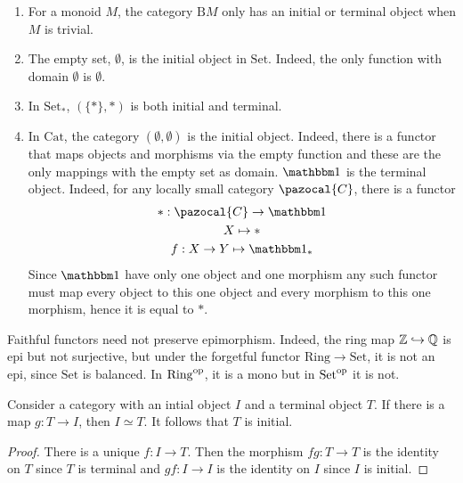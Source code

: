 \begin{example}
\begin{enumerate}
            \item For a monoid $M$, the category $\mathrm{B}M$ only has an initial or terminal object when $M$ is trivial. 
            \item The empty set, $\emptyset$, is the initial object in $\mathrm{Set}$. Indeed, the only function with domain $\emptyset$ is $\emptyset$.
            \item In $\mathrm{Set}_\ast$, $(\{\ast\},\ast)$ is both initial and terminal.
            \item In $\mathrm{Cat}$, the category $(\emptyset,\emptyset)$ is the initial object. Indeed, there is a functor that maps objects and morphisms via the empty function and these are the only mappings with the empty set as domain. $\fone$ is the terminal object. Indeed, for any locally small category $\pazocal{C}$, there is a functor 
            \begin{gather*}
                \ast : \pazocal{C}\rightarrow\fone\\
                X\mapsto \ast\\
                f: X\rightarrow Y \mapsto \fone_\ast
            \end{gather*}  
            Since $\fone$ have only one object and one morphism any such functor must map every object to this one object and every morphism to this one morphism, hence it is equal to $\ast$.  
        \end{enumerate}
    \end{example}
    \begin{example}
        Faithful functors need not preserve epimorphism. Indeed, the ring map $\mathbb{Z}\hookrightarrow \mathbb{Q}$ is epi but not surjective, but under the forgetful functor $\mathrm{Ring}\rightarrow \mathrm{Set}$, it is not an epi, since $\mathrm{Set}$ is balanced. In $\mathrm{Ring}^\mathrm{op}$, it is a mono but in $\mathrm{Set}^\mathrm{op}$ it is not. 
    \end{example}
    \begin{proposition}
        Consider a category with an intial object $I$ and a terminal object $T$. If there is a map $g: T\rightarrow I$, then $I\simeq T$. It follows that $T$ is initial.
    \end{proposition}
    \begin{proof}
        There is a unique $f: I \rightarrow T$. Then the morphism $fg : T\rightarrow T$ is the identity on $T$ since $T$ is terminal and $gf : I\rightarrow I$ is the identity on $I$ since $I$ is initial.
    \end{proof}
